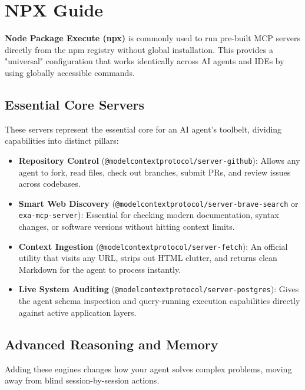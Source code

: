 \newpage

\section{NPX Guide}

\textbf{Node Package Execute (npx)} is commonly used to run pre-built MCP servers directly from the npm registry without global installation. 
This provides a "universal" configuration that works identically across AI agents and IDEs by using globally accessible commands.

\subsection{Essential Core Servers}
These servers represent the essential core for an AI agent's toolbelt, dividing capabilities into distinct pillars:

\begin{itemize}
    \item \textbf{Repository Control} (\lstinline[style=inline]|@modelcontextprotocol/server-github|): Allows any agent to fork, read files, check out branches, submit PRs, and review issues across codebases.
    \item \textbf{Smart Web Discovery} (\lstinline[style=inline]|@modelcontextprotocol/server-brave-search| or \lstinline[style=inline]|exa-mcp-server|): Essential for checking modern documentation, syntax changes, or software versions without hitting context limits.
    \item \textbf{Context Ingestion} (\lstinline[style=inline]|@modelcontextprotocol/server-fetch|): An official utility that visits any URL, strips out HTML clutter, and returns clean Markdown for the agent to process instantly.
    \item \textbf{Live System Auditing} (\lstinline[style=inline]|@modelcontextprotocol/server-postgres|): Gives the agent schema inspection and query-running execution capabilities directly against active application layers.
\end{itemize}

\subsection{Advanced Reasoning and Memory}
Adding these engines changes how your agent solves complex problems, moving away from blind session-by-session actions.

